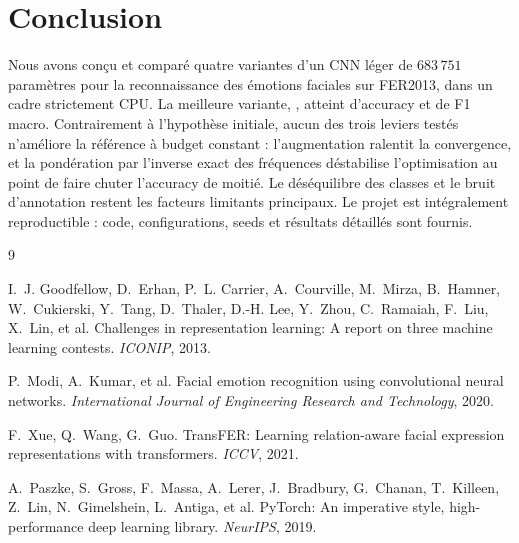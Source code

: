 \documentclass[11pt,a4paper]{article}
\newcommand{\NumParams}{683\,751}
\begin{document}
\section{Conclusion}

Nous avons conçu et comparé quatre variantes d'un CNN léger de $\NumParams$
paramètres pour la reconnaissance des émotions faciales sur FER2013, dans un
cadre strictement CPU. La meilleure variante, \BestName, atteint \BestAcc{}
d'accuracy et \BestF{} de F1 macro. Contrairement à l'hypothèse initiale,
aucun des trois leviers testés n'améliore la référence à budget constant :
l'augmentation ralentit la convergence, et la pondération par l'inverse exact
des fréquences déstabilise l'optimisation au point de faire chuter l'accuracy
de moitié. Le déséquilibre des classes et le bruit d'annotation restent les
facteurs limitants principaux. Le projet est intégralement reproductible :
code, configurations, seeds et résultats détaillés sont fournis.

{\small
\begin{thebibliography}{9}

I.~J. Goodfellow, D.~Erhan, P.~L. Carrier, A.~Courville, M.~Mirza,
B.~Hamner, W.~Cukierski, Y.~Tang, D.~Thaler, D.-H. Lee, Y.~Zhou,
C.~Ramaiah, F.~Liu, X.~Lin, et al.
\newblock Challenges in representation learning: A report on three machine
learning contests.
\newblock \emph{ICONIP}, 2013.

P.~Modi, A.~Kumar, et al.
\newblock Facial emotion recognition using convolutional neural networks.
\newblock \emph{International Journal of Engineering Research and Technology},
2020.

F.~Xue, Q.~Wang, G.~Guo.
\newblock TransFER: Learning relation-aware facial expression representations
with transformers.
\newblock \emph{ICCV}, 2021.

A.~Paszke, S.~Gross, F.~Massa, A.~Lerer, J.~Bradbury, G.~Chanan,
T.~Killeen, Z.~Lin, N.~Gimelshein, L.~Antiga, et al.
\newblock PyTorch: An imperative style, high-performance deep learning library.
\newblock \emph{NeurIPS}, 2019.

\end{thebibliography}}
\end{document}
